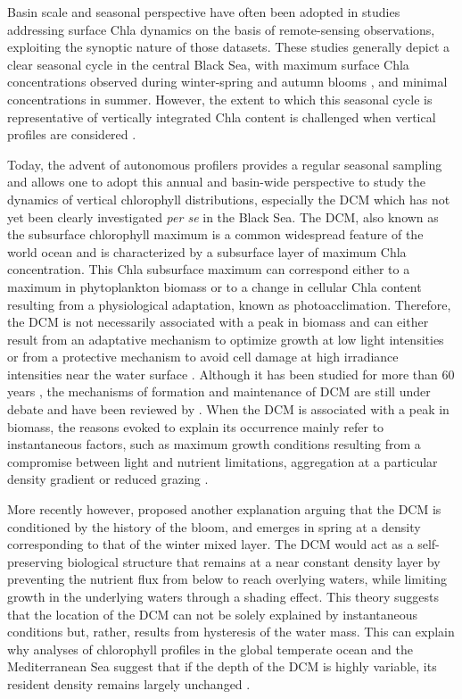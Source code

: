 \documentclass[journal abbreviation, manuscript]{copernicus}
\begin{document}
Basin scale and seasonal perspective have often been adopted in studies addressing surface Chla dynamics on the basis of remote-sensing observations, exploiting the synoptic nature of those datasets. 
These studies generally depict a clear seasonal cycle in the central Black Sea, with maximum surface Chla concentrations observed during winter-spring and autumn blooms \citep[e.g.][]{Kopelevich2002, Finenko2014}, and minimal concentrations in summer.
However, the extent to which this seasonal cycle is representative of vertically integrated Chla content is challenged when vertical profiles are considered \citep{Finenko2005}.

Today, the advent of autonomous profilers provides a regular seasonal sampling and allows one to adopt this annual and basin-wide perspective to study the dynamics of vertical chlorophyll distributions, especially the DCM which has not yet been clearly investigated \textit{per se} in the Black Sea.
The DCM, also known as the subsurface chlorophyll maximum \citep{Cullen2015} is a common widespread feature of the world ocean and is characterized by a subsurface layer of maximum Chla concentration.
This Chla subsurface maximum can correspond either to a maximum in phytoplankton biomass \citep{Varela1992, Estrada1993, Beckmann2007, Mignot2014} or to a change in cellular Chla content resulting from a physiological adaptation, known as photoacclimation.
Therefore, the DCM is not necessarily associated with a peak in biomass \citep{Fennel2003} and can either result from an adaptative mechanism to optimize growth at low light intensities \citep{Fennel2003, Dubinsky2009} or from a protective mechanism to avoid cell damage at high irradiance intensities near the water surface \citep{Marra1997, Xing2012}.
Although it has been studied for more than 60 years \citep{Anderson1969, Cullen1982, Furuya1990, Parslow2001, Huisman2006, Ardyna2013}, the mechanisms of formation and maintenance of DCM are still under debate and have been reviewed by \citet{Cullen2015}.
When the DCM is associated with a peak in biomass, the reasons evoked to explain its occurrence mainly refer to instantaneous factors, such as maximum growth conditions resulting from a compromise between light and nutrient limitations, aggregation at a particular density gradient \citep{Richardson1995} or reduced grazing \citep{Macedo2000}.

More recently however, \citet{Navarro2013} proposed another explanation arguing that the DCM is conditioned by the history of the bloom, and emerges in spring at a density corresponding to that of the winter mixed layer.
The DCM would act as a self-preserving biological structure that remains at a near constant density layer by preventing the nutrient flux from below to reach overlying waters, while limiting growth in the underlying waters through a shading effect.
This theory suggests that the location of the DCM can not be solely explained by instantaneous conditions but, rather, results from hysteresis of the water mass.
This can explain why analyses of chlorophyll profiles in the global temperate ocean and the Mediterranean Sea suggest that if the depth of the DCM is highly variable, its resident density remains largely unchanged \citep{Yilmaz1994,Ediger1996,Navarro2013}.
\end{document}
